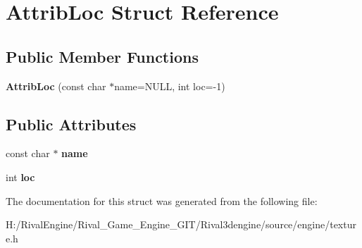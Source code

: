 \hypertarget{struct_attrib_loc}{}\section{Attrib\+Loc Struct Reference}
\label{struct_attrib_loc}
\subsection*{Public Member Functions}
\begin{DoxyCompactItemize}
\item 
\mbox{\label{struct_attrib_loc_ac841d70515f33500844412625259e762}} 
{\bfseries Attrib\+Loc} (const char $\ast$name=N\+U\+LL, int loc=-\/1)
\end{DoxyCompactItemize}
\subsection*{Public Attributes}
\begin{DoxyCompactItemize}
\item 
\mbox{\label{struct_attrib_loc_a59caa383dda614aea9fbad8748017080}} 
const char $\ast$ {\bfseries name}
\item 
\mbox{\label{struct_attrib_loc_a59ffb6988f87e3d600cf9b96defc989a}} 
int {\bfseries loc}
\end{DoxyCompactItemize}


The documentation for this struct was generated from the following file\+:\begin{DoxyCompactItemize}
\item 
H\+:/\+Rival\+Engine/\+Rival\+\_\+\+Game\+\_\+\+Engine\+\_\+\+G\+I\+T/\+Rival3dengine/source/engine/texture.\+h\end{DoxyCompactItemize}
